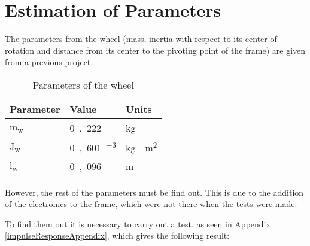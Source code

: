 \section{Estimation of Parameters}
The parameters from the wheel (mass, inertia with respect to its center of rotation and distance from its center to the pivoting point of the frame) are given from a previous project.

\begin{table}[H]
	\begin{tabular}{|l|l|p{2cm}|}
		\hline %
		\textbf{Parameter} &\textbf{Value} &\textbf{Units}\\
		\hline %
		\si{m_w}         & \si{0,222}       &kg\\
		\hline %
		\si{J_w}            & \si{0,601 \cdot 10^{-3}}	&\si{kg \cdot m^2}\\
		\hline %
		\si{l_w}         & \si{0,096}       &m\\
		\hline 
	\end{tabular}
	\caption{Parameters of the wheel}
	\label{ParametersWheel}
\end{table}

However, the rest of the parameters must be find out. This is due to the addition of the electronics to the frame, which were not there when the tests were made.

To find them out it is necessary to carry out a test, as seen in Appendix \ref{impulseResponseAppendix}, which gives the following result:
